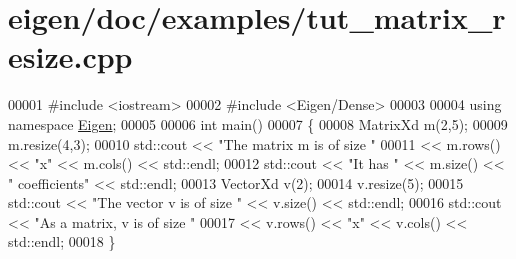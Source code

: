 \hypertarget{eigen_2doc_2examples_2tut__matrix__resize_8cpp_source}{}\section{eigen/doc/examples/tut\+\_\+matrix\+\_\+resize.cpp}
\label{eigen_2doc_2examples_2tut__matrix__resize_8cpp_source}

\begin{DoxyCode}
00001 \textcolor{preprocessor}{#include <iostream>}
00002 \textcolor{preprocessor}{#include <Eigen/Dense>}
00003 
00004 \textcolor{keyword}{using namespace }\hyperlink{namespace_eigen}{Eigen};
00005 
00006 \textcolor{keywordtype}{int} main()
00007 \{
00008   MatrixXd m(2,5);
00009   m.resize(4,3);
00010   std::cout << \textcolor{stringliteral}{"The matrix m is of size "}
00011             << m.rows() << \textcolor{stringliteral}{"x"} << m.cols() << std::endl;
00012   std::cout << \textcolor{stringliteral}{"It has "} << m.size() << \textcolor{stringliteral}{" coefficients"} << std::endl;
00013   VectorXd v(2);
00014   v.resize(5);
00015   std::cout << \textcolor{stringliteral}{"The vector v is of size "} << v.size() << std::endl;
00016   std::cout << \textcolor{stringliteral}{"As a matrix, v is of size "}
00017             << v.rows() << \textcolor{stringliteral}{"x"} << v.cols() << std::endl;
00018 \}
\end{DoxyCode}
